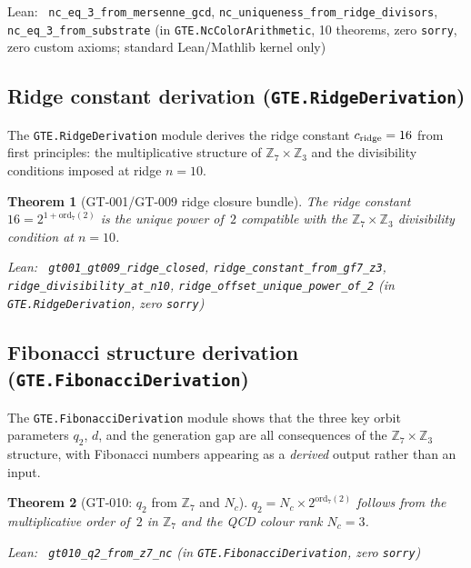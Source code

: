 \documentclass[11pt,a4paper]{article}
\newenvironment{leanref}%
  {\par\smallskip\noindent\begingroup\raggedright\textup{Lean:}~}%
  {\par\endgroup}
\newtheorem{theorem}{Theorem}[section]
\theoremstyle{definition}
\begin{document}
\begin{leanref}
\lstinline|nc_eq_3_from_mersenne_gcd|, \lstinline|nc_uniqueness_from_ridge_divisors|,
\lstinline|nc_eq_3_from_substrate|
\textup{(in \texttt{GTE.NcColorArithmetic}, 10 theorems, zero \texttt{sorry},
zero custom axioms; standard Lean/Mathlib kernel only)}
\end{leanref}

\subsection{Ridge constant derivation (\texttt{GTE.RidgeDerivation})}\label{subsec:ridge-derivation}

The \texttt{GTE.RidgeDerivation} module derives the ridge constant $c_{\rm ridge} = 16$
from first principles: the multiplicative structure of $\mathbb{Z}_7 \times \mathbb{Z}_3$
and the divisibility conditions imposed at ridge $n = 10$.

\begin{theorem}[GT-001/GT-009 ridge closure bundle]\label{thm:ridge-closed}
The ridge constant $16 = 2^{1 + \mathrm{ord}_7(2)}$ is the \emph{unique} power of~$2$
compatible with the $\mathbb{Z}_7 \times \mathbb{Z}_3$ divisibility condition at $n = 10$.

\begin{leanref}
\lstinline|gt001_gt009_ridge_closed|, \lstinline|ridge_constant_from_gf7_z3|,
\lstinline|ridge_divisibility_at_n10|, \lstinline|ridge_offset_unique_power_of_2|
\textup{(in \texttt{GTE.RidgeDerivation}, zero \texttt{sorry})}
\end{leanref}
\end{theorem}

\subsection{Fibonacci structure derivation (\texttt{GTE.FibonacciDerivation})}\label{subsec:fib-derivation}

The \texttt{GTE.FibonacciDerivation} module shows that the three key orbit parameters
$q_2$, $d$, and the generation gap are all consequences of the $\mathbb{Z}_7 \times \mathbb{Z}_3$
structure, with Fibonacci numbers appearing as a \emph{derived} output rather than an input.

\begin{theorem}[GT-010: $q_2$ from $\mathbb{Z}_7$ and $N_c$]\label{thm:q2-from-z7}
$q_2 = N_c \times 2^{\mathrm{ord}_7(2)}$ follows from the multiplicative order of~$2$
in $\mathbb{Z}_7$ and the QCD colour rank $N_c = 3$.

\begin{leanref}
\lstinline|gt010_q2_from_z7_nc|
\textup{(in \texttt{GTE.FibonacciDerivation}, zero \texttt{sorry})}
\end{leanref}
\end{theorem}
\end{document}
